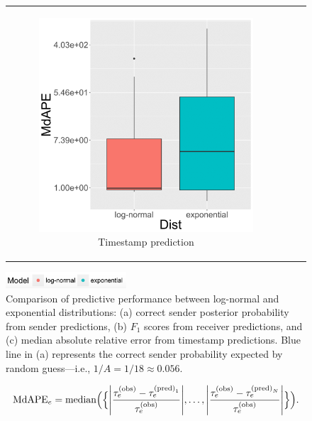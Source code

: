 \documentclass[ba]{imsart}
\numberwithin{equation}{section}
\theoremstyle{plain}
\DeclarePairedDelimiter\abs{\lvert}{\rvert}
\begin{document}
\begin{figure}[!t]
\begin{tabular}[t]{ccc}
\begin{subfigure}[b]{0.33\textwidth}
			\end{subfigure}
			\begin{subfigure}[b]{0.33\textwidth}
				\caption{Timestamp prediction}
				\includegraphics[width=\textwidth]{img/timepredict-1.png}	
			\end{subfigure}
		\end{tabular}
		\includegraphics[width=0.4\textwidth]{img/modellabel.png}				
		\caption {Comparison of predictive performance between log-normal and exponential distributions: (a) correct sender posterior probability from sender predictions, (b) $F_1$ scores from receiver predictions, and (c) median absolute relative error from timestamp predictions. Blue line in (a) represents the correct sender probability expected by random guess---i.e., $1/A=1/18\approx0.056$.}
		\label{figure:PPEresults}
	\end{figure}		
	\begin{equation}
		\mbox{MdAPE}_{e} = \mbox{median}\Big(\Big\{\abs*{\frac{\tau^{\textrm{(obs)}}_e - \tau^{\textrm{(pred)}_1}_{e}}{\tau^{\textrm{(obs)}}_e}},\ldots, \abs*{\frac{\tau^{\textrm{(obs)}}_e - \tau^{\textrm{(pred)}_N}_{e}}{\tau^{\textrm{(obs)}}_e}}\Big\}\Big).
	\end{equation}
\end{document}
